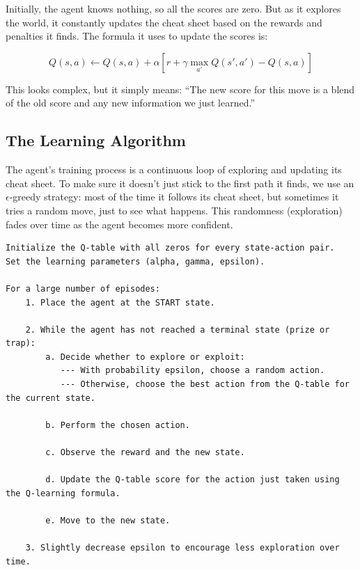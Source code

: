 \documentclass[11pt, a4paper]{article}
\begin{document}
Initially, the agent knows nothing, so all the scores are zero. But as it explores the world, it constantly updates the cheat sheet based on the rewards and penalties it finds. The formula it uses to update the scores is:

\begin{equation}
Q(s, a) \leftarrow Q(s, a) + \alpha [r + \gamma \max_{a'} Q(s', a') - Q(s, a)]
\end{equation}

This looks complex, but it simply means: ``The new score for this move is a blend of the old score and any new information we just learned.''

\subsection{The Learning Algorithm}
The agent's training process is a continuous loop of exploring and updating its cheat sheet. To make sure it doesn't just stick to the first path it finds, we use an $\epsilon$-greedy strategy: most of the time it follows its cheat sheet, but sometimes it tries a random move, just to see what happens. This randomness (exploration) fades over time as the agent becomes more confident.

\begin{center}
\begin{BVerbatim}[frame=single, label=Algorithm Pseudocode]
Initialize the Q-table with all zeros for every state-action pair.
Set the learning parameters (alpha, gamma, epsilon).

For a large number of episodes:
    1. Place the agent at the START state.

    2. While the agent has not reached a terminal state (prize or trap):
        a. Decide whether to explore or exploit:
           --- With probability epsilon, choose a random action.
           --- Otherwise, choose the best action from the Q-table for the current state.

        b. Perform the chosen action.
        
        c. Observe the reward and the new state.
        
        d. Update the Q-table score for the action just taken using the Q-learning formula.
        
        e. Move to the new state.

    3. Slightly decrease epsilon to encourage less exploration over time.
\end{BVerbatim}
\end{center}
\end{document}
